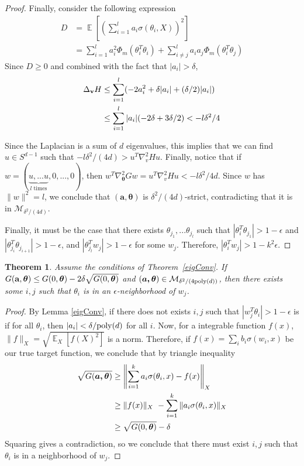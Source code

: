 \documentclass{article}
\newtheorem{theorem}{Theorem}[section]
\DeclareMathOperator*{\expt}{\mathbb{E}}
\begin{document}
\begin{proof}
Finally, consider the following expression
%
\begin{align*}
D & = \expt\left[\left( \sum_{i=1}^l a_i \sigma(\theta_i,X)\right)^2\right] \\
%
& =\sum_{i=1}^l a_i^2\Phi_m(\theta_i^T\theta_i) + \sum_{i \neq j}^l
  a_ia_j\Phi_m(\theta_i^T\theta_j)
\end{align*}
%
Since $D \geq 0$ and combined with the fact that $|a_i| > \delta$,
%
\begin{align*}
\Delta_{{\bf v}}H & \leq  \sum_{i=1}^l (-2a_i^2 +\delta |a_i|+(\delta/2)|a_i|) \\
& \leq   \sum_{i=1}^l  |a_i|(-2\delta + 3\delta/2) < -l\delta^2/4
\end{align*}

Since the Laplacian is a sum of $d$ eigenvalues, this implies that we can find $u \in S^{d-1}$ such that $-l\delta^2/(4d) > u^T\nabla^2_v H u$. Finally, notice that if $w = (\underbrace{u,...u}_{l {\textrm{ times}}},0,...,0)$, then $w^T\nabla^2_{\boldsymbol{\theta}} G w = u^T\nabla^2_v H u < -l\delta^2/4d$. Since $w$ has $\|w\|^2 = l$, we conclude that $(\boldsymbol{a,\theta})$ is $\delta^2/(4d)$-strict, contradicting that it is in $\mathcal{M}_{\delta^2/(4d)}$. 

Finally, it must be the case that there exists $\theta_{j_1},...\theta_{j_l}$ such that
$|\theta_i^T\theta_{j_1}| > 1-\epsilon$ and
$|\theta_{j_{i}}^T\theta_{j_{i+1}}| > 1-\epsilon$, and
$|\theta_{j_l}^Tw_j| > 1-\epsilon$ for some $w_j$. Therefore,
$|\theta_i^Tw_j| > 1- k^2\epsilon$. 
\end{proof}

\begin{theorem}\label{eigRes}
  Assume the conditions of Theorem~\ref{eigConv}. If
$G({\bf a, \boldsymbol{\theta}}) \leq G(0,\boldsymbol{\theta}) - 2\delta\sqrt{G(0,\boldsymbol{\theta})}$
  and $(\boldsymbol{a,\theta}) \in \mathcal{M}_{\delta^2/(4\mathrm{poly}(d))}$,
  then there exists some $i, j$ such that $\theta_i$ is in an
  $\epsilon$-neighborhood of $w_j$.
\end{theorem}
 
 \begin{proof}
   By Lemma \ref{eigConv}, if there does not exists $i, j$ such that
   $|w_j^T\theta_i| > 1-\epsilon$ is if for all $\theta_i$, then
   $|a_i| < \delta/\mathrm{poly}(d)$ for all $i$. Now, for a integrable
   function $f(x)$, $\| f\|_X = \sqrt{\expt_X[f(X)^2]}$ is a
   norm. Therefore, if $f(x) = \sum_i b_i \sigma(w_i,x)$ be our true
   target function, we conclude that by triangle inequality
\begin{align*}
\sqrt{G(\boldsymbol{a,\theta})}  & \geq \left\lVert \sum_{i=1}^k a_i \sigma(\theta_i,x) - f(x) \right\rVert_X \\
&\geq \|f(x)\|_X\ - \sum_{i=1}^k \|a_i\sigma(\theta_i,x) \|_X \\
& \geq
  \sqrt{G(0,\boldsymbol{\theta})} - \delta
\end{align*}
Squaring gives a contradiction, so we conclude that there must exist $i, j$ such that $\theta_i$ is in a neighborhood of $w_j$.
 \end{proof}
 
\end{document}
